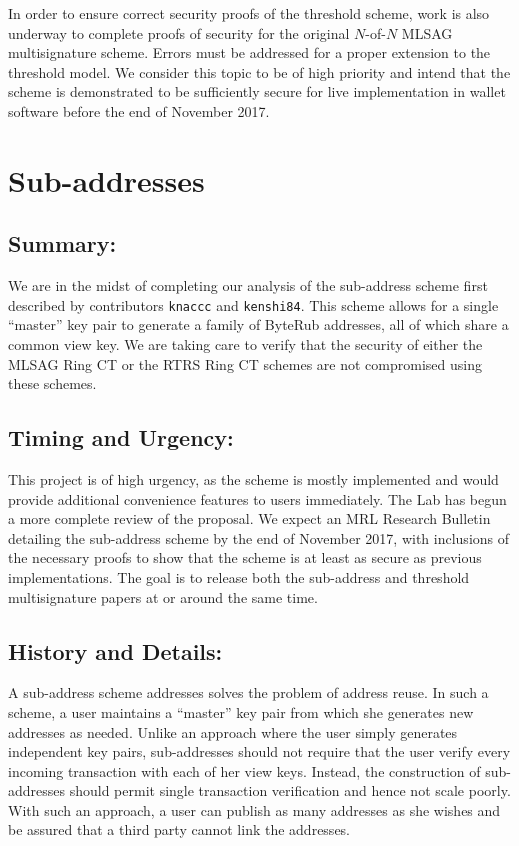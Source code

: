 \documentclass[12pt,english]{mrl}
\theoremstyle{definition}
\numberwithin{equation}{section}
\numberwithin{figure}{section}
\numberwithin{equation}{section}
\numberwithin{equation}{section}
\numberwithin{figure}{section}
\begin{document}
In order to ensure correct security proofs of the threshold scheme, work is also underway to complete proofs of security for the original $N$-of-$N$ MLSAG multisignature scheme. Errors must be addressed for a proper extension to the threshold model. We consider this topic to be of high priority and intend that the scheme is demonstrated to be sufficiently secure for live implementation in wallet software before the end of November 2017.




\section{Sub-addresses}


\subsection{Summary:} 

We are in the midst of completing our analysis of the sub-address scheme first described by contributors \texttt{knaccc} and \texttt{kenshi84}. This scheme allows for a single ``master'' key pair to generate a family of ByteRub addresses, all of which share a common view key. We are taking care to verify that the security of either the MLSAG Ring CT or the RTRS Ring CT schemes are not compromised using these schemes.

\subsection{Timing and Urgency:} 

This project is of high urgency, as the scheme is mostly implemented and would provide additional convenience features to users immediately. The Lab has begun a more complete review of the proposal. We expect an MRL Research Bulletin detailing the sub-address scheme by the end of November 2017, with inclusions of the necessary proofs to show that the scheme is at least as secure as previous implementations. The goal is to release both the sub-address and threshold multisignature papers at or around the same time.

\subsection{History and Details:} 

A sub-address scheme addresses solves the problem of address reuse. In such a scheme, a user maintains a ``master'' key pair from which she generates new addresses as needed. Unlike an approach where the user simply generates independent key pairs, sub-addresses should not require that the user verify every incoming transaction with each of her view keys. Instead, the construction of sub-addresses should permit single transaction verification and hence not scale poorly. With such an approach, a user can publish as many addresses as she wishes and be assured that a third party cannot link the addresses. 
\end{document}
